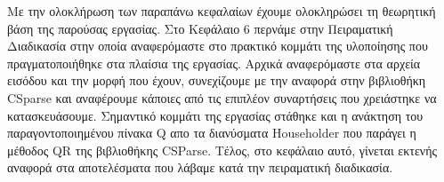 Με την ολοκλήρωση των παραπάνω κεφαλαίων έχουμε ολοκληρώσει τη θεωρητική βάση της παρούσας εργασίας. Στο Κεφάλαιο 6 περνάμε στην Πειραματική Διαδικασία στην οποία αναφερόμαστε στο πρακτικό κομμάτι της υλοποίησης που πραγματοποιήθηκε στα πλαίσια της εργασίας. Αρχικά αναφερόμαστε στα αρχεία εισόδου και την μορφή που έχουν, συνεχίζουμε με την αναφορά στην βιβλιοθήκη \textlatin{CSparse} και αναφέρουμε κάποιες από τις επιπλέον συναρτήσεις που χρειάστηκε να κατασκευάσουμε. Σημαντικό κομμάτι της εργασίας στάθηκε και η ανάκτηση του παραγοντοποιημένου πίνακα \textlatin{Q} απο τα διανύσματα \textlatin{Householder} που παράγει η μέθοδος \textlatin{QR} της βιβλιοθήκης \textlatin{CSParse}. Τέλος, στο κεφάλαιο αυτό, γίνεται εκτενής αναφορά στα αποτελέσματα που λάβαμε κατά την πειραματική διαδικασία.